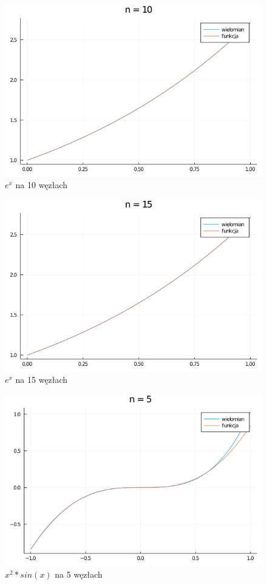 \documentclass[12pt]{article}
\begin{document}
\begin{figure}[h!]
    \caption{$e^x$ na 10 węzłach}
    \centering
    \includegraphics[scale=0.5]{z5f_10.png}
\end{figure}
\begin{figure}[h!]
    \caption{$e^x$ na 15 węzłach}
    \centering
    \includegraphics[scale=0.5]{z5f_15.png}
\end{figure}

\begin{figure}[h!]
    \caption{$x^2 * sin(x)$ na 5 węzłach}
    \centering
    \includegraphics[scale=0.5]{z5g_5.png}
\end{figure}
\end{document}
